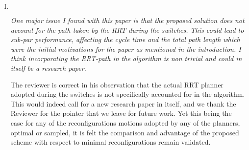 \documentclass[11pt]{article}
\newenvironment{reviewer}
{\begin{mdframed}[roundcorner = 10pt,fontcolor=blue!70!black]\itshape}
{\end{mdframed}}
\begin{document}
\begin{enumerate}[I.]

 \item $ $
  \begin{reviewer}
    One major issue I found with this paper is that the proposed solution does not account for the path taken by the RRT during the switches. This could lead to sub-par performance, affecting the cycle time and the total path length which were the initial motivations for the paper as mentioned in the introduction. I think incorporating the RRT-path in the algorithm is non trivial and could in itself be a research paper. 
\begin{comment}
For this submission, it would be good to run some experiments in highly constrained environments to see if the total path length (joint-space) is different across many optimal solutions produced by the proposed method.
Specifically reporting the path length during the task-space tracking and rrt-path for switching separately will be very insightful. 
Additionally reporting time taken on the real robot will help show the improvement with the proposed method. 
\end{comment}
  \end{reviewer}


The reviewer is correct in his observation that the actual RRT planner adopted during the switches is not specifically accounted for in the algorithm. 
This would indeed call for a new research paper in itself, and we thank the Reviewer for the pointer that we leave for future work.
Yet this being the case for any of the reconfigurations motions adopted by any of the planners, optimal or sampled, it is felt the comparison and advantage of the proposed scheme with respect to minimal reconfigurations remain validated. 




\end{enumerate}
\end{document}
